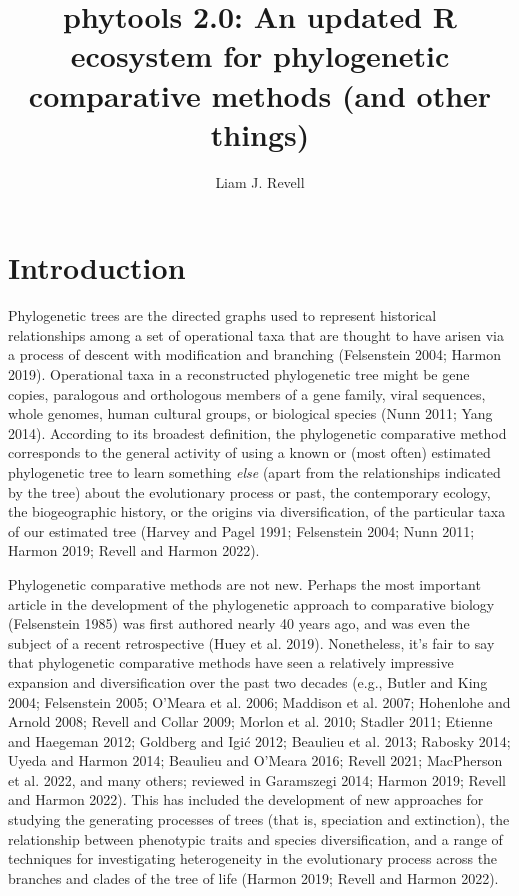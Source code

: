 \documentclass[fleqn,10pt,lineno]{wlpeerj} %
\title{phytools 2.0: An updated R ecosystem for phylogenetic comparative methods (and other things)}
\author[1, 2]{Liam J. Revell}
\affil[1]{Department of Biology, University of Massachusetts Boston, Boston, MA, USA}
\affil[2]{Facultad de Ciencias, Universidad Católica de la Santísima Concepción, Concepción, Chile}
\begin{document}
\flushbottom
\maketitle
\thispagestyle{empty}

\hypertarget{introduction}{%
\section{Introduction}\label{introduction}}

Phylogenetic trees are the directed graphs used to represent historical relationships among a set of operational taxa that are thought to have arisen via a process of descent with modification and branching (Felsenstein 2004; Harmon 2019). Operational taxa in a reconstructed phylogenetic tree might be gene copies, paralogous and orthologous members of a gene family, viral sequences, whole genomes, human cultural groups, or biological species (Nunn 2011; Yang 2014). According to its broadest definition, the phylogenetic comparative method corresponds to the general activity of using a known or (most often) estimated phylogenetic tree to learn something \emph{else} (apart from the relationships indicated by the tree) about the evolutionary process or past, the contemporary ecology, the biogeographic history, or the origins via diversification, of the particular taxa of our estimated tree (Harvey and Pagel 1991; Felsenstein 2004; Nunn 2011; Harmon 2019; Revell and Harmon 2022).

Phylogenetic comparative methods are not new. Perhaps the most important article in the development of the phylogenetic approach to comparative biology (Felsenstein 1985) was first authored nearly 40 years ago, and was even the subject of a recent retrospective (Huey et al. 2019). Nonetheless, it's fair to say that phylogenetic comparative methods have seen a relatively impressive expansion and diversification over the past two decades (e.g., Butler and King 2004; Felsenstein 2005; O'Meara et al. 2006; Maddison et al. 2007; Hohenlohe and Arnold 2008; Revell and Collar 2009; Morlon et al. 2010; Stadler 2011; Etienne and Haegeman 2012; Goldberg and Igić 2012; Beaulieu et al. 2013; Rabosky 2014; Uyeda and Harmon 2014; Beaulieu and O'Meara 2016; Revell 2021; MacPherson et al. 2022, and many others; reviewed in Garamszegi 2014; Harmon 2019; Revell and Harmon 2022). This has included the development of new approaches for studying the generating processes of trees (that is, speciation and extinction), the relationship between phenotypic traits and species diversification, and a range of techniques for investigating heterogeneity in the evolutionary process across the branches and clades of the tree of life (Harmon 2019; Revell and Harmon 2022).
\end{document}
